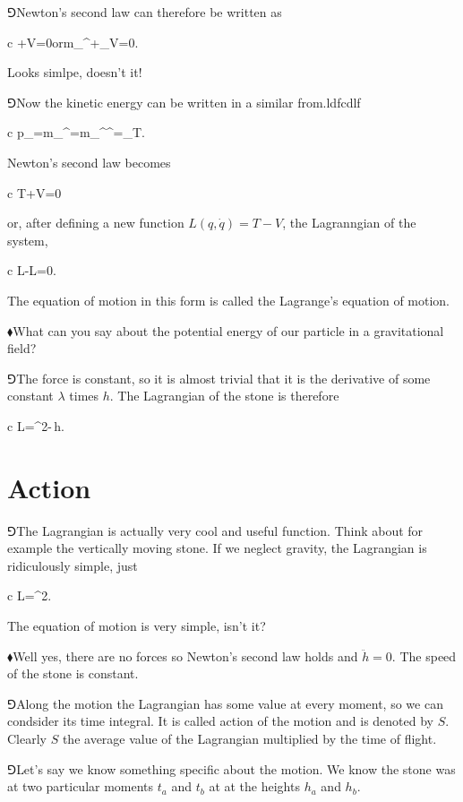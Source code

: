 \documentclass[11pt,oneside%
]{memoir}
\newenvironment{eqna}{\begin{IEEEeqnarray*}{c}}{\end{IEEEeqnarray*}\ignorespacesafterend}
\newcommand{\der}[2]{\frac{\dd#1}{\dd#2}}
\newcommand{\puoli}{\frac{1}{2}}
\newcommand{\orr}{\qquad\textrm{or}\qquad}
\newcommand{\dd}{\mathrm{d}}
\newcommand{\hea}{\(\blacklozenge\)\;}
\newcommand{\heb}{\(\Game\)\;}
\newcommand{\coa}{{\color{black}\bullet}}
\newcommand{\cob}{{\color{oranssi}\bullet}}
\begin{document}
\heb Newton's second law can therefore be written as
\begin{eqna}
    +\nabla V=0\orr m_{\coa\cob}^\cob+\nabla_\coa V=0.
\end{eqna}
Looks simlpe, doesn't it!

\heb Now the kinetic energy can be written in a similar from.ldfcdlf
\begin{eqna}
    p_\coa=m_{\coa\cob}^\coa=\puoli\dot{\nabla}m_{\coa\cob}^\coa{}^\cob=\dot{\nabla}_\coa T.
\end{eqna}
Newton's second law becomes
\begin{eqna}
    \der{}{t}\dot{\nabla}T+\nabla V=0
\end{eqna}
or, after defining a new function \(L(q,\dot{q})=T-V\), the Lagranngian of the system,
\begin{eqna}
    \der{}{t}\dot{\nabla}L-\nabla L=0.
\end{eqna}
The equation of motion in this form is called the Lagrange's equation of motion.

\hea What can you say about the potential energy of our particle in a gravitational field?

\heb The force is constant, so it is almost trivial that it is the derivative of some constant \(\lambda\) times \(h\). The Lagrangian of the stone is therefore
\begin{eqna}
    L=\puoli{}^2-\lambda\,h.
\end{eqna}
\section{Action}
\heb The Lagrangian is actually very cool and useful function. Think about for example the vertically moving stone. If we neglect gravity, the Lagrangian is ridiculously simple, just
\begin{eqna}
    L=\puoli{}^2.
\end{eqna}
The equation of motion is very simple, isn't it?

\hea Well yes, there are no forces so Newton's second law holds and \(\ddot{h}=0\). The speed of the stone is constant.

\heb Along the motion the Lagrangian has some value at every moment, so we can condsider its time integral. It is called action of the motion and is denoted by \(S\). Clearly \(S\) the average value of the Lagrangian multiplied by the time of flight.

\heb Let's say we know something specific about the motion. We know the stone was at two particular moments \(t_a\) and \(t_b\) at at the heights \(h_a\) and \(h_b\).
\end{document}
